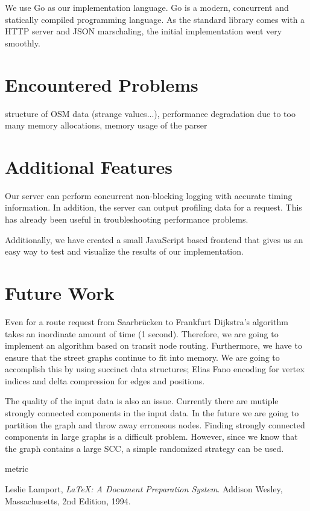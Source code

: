 \documentclass[a4paper]{article}
\begin{document}
We use Go as our implementation language.
Go is a modern, concurrent and statically compiled programming language.
As the standard library comes with a HTTP server and JSON marschaling,
the initial implementation went very smoothly.

\section{Encountered Problems}
structure of OSM data (strange values...),
performance degradation due to too many memory allocations,
memory usage of the parser

\section{Additional Features}

Our server can perform concurrent non-blocking logging with accurate timing information.
In addition, the server can output profiling data for a request.
This has already been useful in troubleshooting performance problems.

Additionally, we have created a small JavaScript based frontend that 
gives us an easy way to test and visualize the results of our implementation.

\section{Future Work}

Even for a route request from Saarbrücken to Frankfurt Dijkstra's algorithm takes an inordinate amount of time (1 second).
Therefore, we are going to implement an algorithm based on transit node routing.
Furthermore, we have to ensure that the street graphs continue to fit into memory.
We are going to accomplish this by using succinct data structures;
Elias Fano encoding for vertex indices and delta compression for edges and positions.

The quality of the input data is also an issue.
Currently there are mutiple strongly connected components in the input data.
In the future we are going to partition the graph and throw away erroneous nodes.
Finding strongly connected components in large graphs is a difficult problem.
However, since we know that the graph contains a large SCC,
a simple randomized strategy can be used.

metric

\begin{thebibliography}{9}

  Leslie Lamport,
  \emph{\LaTeX: A Document Preparation System}.
  Addison Wesley, Massachusetts,
  2nd Edition,
  1994.

\end{thebibliography}
\end{document}

